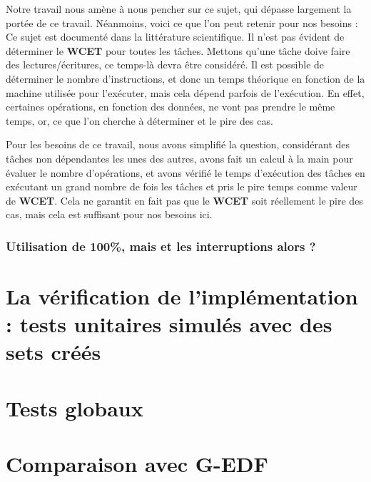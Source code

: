 		Notre travail nous amène à nous pencher sur ce sujet, qui dépasse largement la portée de ce travail. 
		Néanmoins, voici ce que l'on peut retenir pour nos besoins :\\
		Ce sujet est documenté dans la littérature scientifique. Il n'est pas évident de déterminer le 
		\textbf{WCET} pour toutes les tâches. Mettons qu'une tâche doive faire des lectures/écritures, 
		ce temps-là devra être considéré. Il est possible de déterminer le nombre d'instructions, 
		et donc un temps théorique en fonction de la machine utilisée pour l'exécuter, mais cela dépend 
		parfois de l'exécution. En effet, certaines opérations, en fonction des données, ne vont pas prendre 
		le même temps, or, ce que l'on cherche à déterminer et le pire des cas.\newline
	
		Pour les besoins de ce travail, nous avons simplifié la question, considérant des tâches 
		non dépendantes les unes des autres, avons fait un calcul à la main pour évaluer le 
		nombre d'opérations, et avons vérifié le temps d'exécution des tâches en exécutant un grand nombre 
		de fois les tâches et pris le pire temps comme valeur de \textbf{WCET}. Cela ne garantit en fait 
		pas que le \textbf{WCET} soit réellement le pire des cas, mais cela est suffisant pour nos besoins ici.
	
	\subsubsection{Utilisation de 100\%, mais et les interruptions alors ?}

\section{La vérification de l'implémentation : tests unitaires simulés avec des sets créés}

\section{Tests globaux}

\section{Comparaison avec G-EDF}
